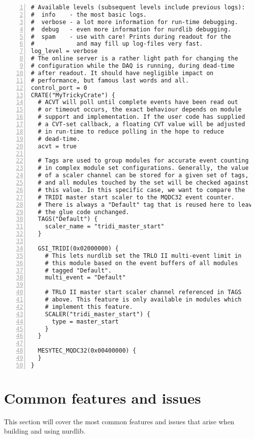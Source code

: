 \documentclass{article}
\begin{document}
\begin{Verbatim}[frame=single,numbers=left]
# Available levels (subsequent levels include previous logs):
#  info    - the most basic logs.
#  verbose - a lot more information for run-time debugging.
#  debug   - even more information for nurdlib debugging.
#  spam    - use with care! Prints during readout for the
#            and may fill up log-files very fast.
log_level = verbose
# The online server is a rather light path for changing the
# configuration while the DAQ is running, during dead-time
# after readout. It should have negligible impact on
# performance, but famous last words and all.
control_port = 0
CRATE("MyTrickyCrate") {
  # ACVT will poll until complete events have been read out
  # or timeout occurs, the exact behaviour depends on module
  # support and implementation. If the user code has supplied
  # a CVT-set callback, a floating CVT value will be adjusted
  # in run-time to reduce polling in the hope to reduce
  # dead-time.
  acvt = true

  # Tags are used to group modules for accurate event counting
  # in complex module set configurations. Generally, the value
  # of a scaler channel can be stored for a given set of tags,
  # and all modules touched by the set will be checked against
  # this value. In this specific case, we want to compare the
  # TRIDI master start scaler to the MQDC32 event counter.
  # There is always a "Default" tag that is reused here to leave
  # the glue code unchanged.
  TAGS("Default") {
    scaler_name = "tridi_master_start"
  }

  GSI_TRIDI(0x02000000) {
    # This lets nurdlib set the TRLO II multi-event limit in
    # this module based on the event buffers of all modules
    # tagged "Default".
    multi_event = "Default"

    # TRLO II master start scaler channel referenced in TAGS
    # above. This feature is only available in modules which
    # implement this feature.
    SCALER("tridi_master_start") {
      type = master_start
    }
  }

  MESYTEC_MQDC32(0x00400000) {
  }
}
\end{Verbatim}



\section{Common features and issues}

This section will cover the most common features and issues that arise when
building and using nurdlib.
\end{document}
